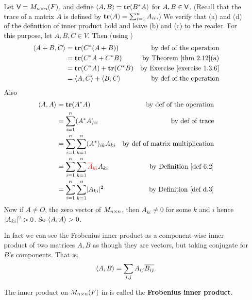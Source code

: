 \begin{example} \label{example 6.1.5}
Let \(\textsf{V} = M_{n \times n}(F)\), and define \(\left< A, B \right> = \textbf{tr}(B^* A)\) for \(A, B \in \textsf{V}\).
(Recall that the trace of a matrix \(A\) is defined by \(\textbf{tr}(A) = \sum_{i = 1}^n A_{ii}\).)
We verify that (a) and (d) of the definition of inner product hold and leave (b) and (c) to the reader. For this purpose, let \(A, B, C \in V\).
Then (using )
\begin{align*}
    \LG A + B, C \RG & = \TRACE(C^* (A + B)) & \text{by def of the operation} \\
        & = \TRACE(C^* A + C^* B) & \text{by \THM{2.12}(a)} \\
        & = \TRACE(C^* A) + \TRACE(C^* B) & \text{by \EXEC{1.3.6}} \\
        & = \LG A, C \RG + \LG B, C \RG & \text{by def of the operation}
\end{align*}
Also
\begin{align*}
    \LG A, A \RG & = \TRACE(A^* A) & \text{by def of the operation} \\
        & = \sum_{i = 1}^n (A^* A)_{ii} & \text{by def of trace} \\
        & = \sum_{i = 1}^n \sum_{k = 1}^n (A^*)_{ik} A_{ki} & \text{by def of matrix multiplication} \\
        & = \sum_{i = 1}^n \sum_{k = 1}^n \RED{\conjugatet{A}_{ki}} A_{ki} & \text{by \DEF{6.2}} \\
        & = \sum_{i = 1}^n \sum_{k = 1}^n \abs{A_{ki}}^2 & \text{by \DEF{d.3}}
\end{align*}
Now if \(A \ne O\), the zero vector of \(M_{n \times n}\), then \(A_{ki} \ne 0\) for some \(k\) and \(i\) hence \(\lvert A_{ki}\rvert^2 > 0\).
So \(\left< A, A \right> > 0\).
\end{example}

\begin{remark} \label{remark 6.1.5}
In fact we can see the Frobenius inner product as a component-wise inner product of two matrices \(A, B\) as though they are vectors, but taking conjugate for \(B\)'s components.
That is,
\[
    \left< A, B \right> = \sum_{i, j} A_{ij} \overline{B_{ij}}.
\]
\end{remark}

\begin{additional definition} \label{adef 6.1}
The inner product on \(M_{n \times n}(F)\) in  is called the \textbf{Frobenius inner product}.
\end{additional definition}


